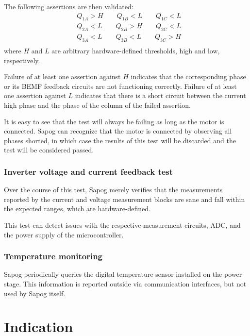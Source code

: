 \documentclass{zubaxdoc}
\begin{document}
	The following assertions are then validated:
	\begin{equation}
		\begin{aligned}
			&Q_{1A} > H \qquad{} Q_{1B} < L \qquad{} Q_{1C} < L \\
			&Q_{2A} < L \qquad{} Q_{2B} > H \qquad{} Q_{2C} < L \\
			&Q_{3A} < L \qquad{} Q_{3B} < L \qquad{} Q_{3C} > H \\
		\end{aligned}
	\end{equation}
	where $H$ and $L$ are arbitrary hardware-defined thresholds, high and low, respectively.
	
	Failure of at least one assertion against $H$ indicates that the corresponding phase
	or its BEMF feedback circuits are not functioning correctly.
	Failure of at least one assertion against $L$ indicates that there is a short circuit between
	the current high phase and the phase of the column of the failed assertion.
	
	It is easy to see that the test will always be failing as long as the motor is connected.
	Sapog can recognize that the motor is connected by observing all phases shorted,
	in which case the results of this test will be discarded and the test will be considered passed.
	
	\subsection{Inverter voltage and current feedback test}
	
	Over the course of this test, Sapog merely verifies that the measurements reported by the
	current and voltage measurement blocks are sane and fall within the expected ranges,
	which are hardware-defined.
	
	This test can detect issues with the respective measurement circuits,
	ADC, and the power supply of the microcontroller.
	
	\subsection{Temperature monitoring}
	
	Sapog periodically queries the digital temperature sensor installed on the power stage.
	This information is reported outside via communication interfaces, but not used
	by Sapog itself.
	
	\chapter{Indication}\label{sec:indication}
	
\end{document}

